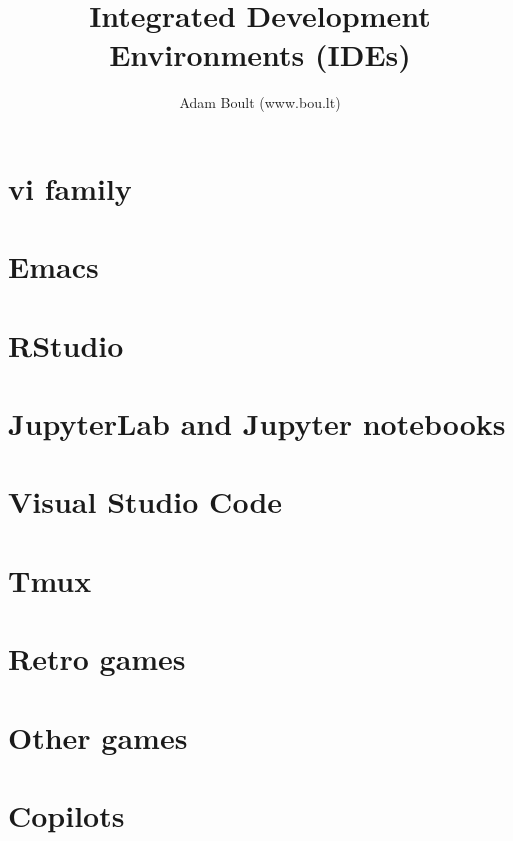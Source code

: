 \documentclass[oneside]{book}
\begin{document}
\author{Adam Boult (www.bou.lt)}
\title{Integrated Development Environments (IDEs)}
\maketitle

\setcounter{tocdepth}{0}
\tableofcontents



\part{vi family}



\part{Emacs}


\part{RStudio}


\part{JupyterLab and Jupyter notebooks}


\part{Visual Studio Code}


\part{Tmux}


\part{Retro games}



\part{Other games}





\part{Copilots}

\end{document}

